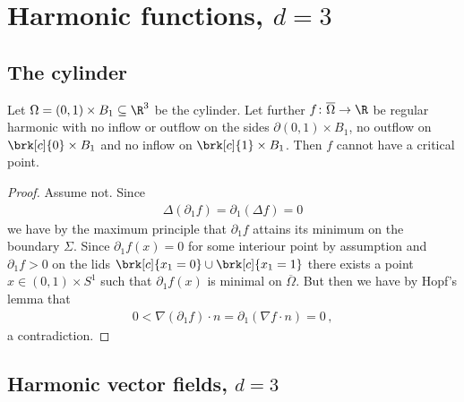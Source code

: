 
\newpage

\section{Harmonic functions, $d=3$}

\subsection{The cylinder}

\begin{proposition}
  Let $\Omega=(0,1)\times B_1\subseteq\R^3$ be the cylinder. Let further $f\colon\overline{\Omega}\to\R$ be regular 
  harmonic with no inflow or outflow on the sides 
  $\partial (0,1)\times B_1$, no outflow on $\brk[c]{0}\times B_1$ and no inflow on $\brk[c]{1}\times B_1$. 
  Then $f$ cannot have a critical point.
\end{proposition}
\begin{proof}
  Assume not. Since
  \begin{align*}
    \Delta(\partial_1f)=\partial_1(\Delta f)=0
  \end{align*}
  we have by the maximum principle that $\partial_1 f$ attains its minimum on the boundary $\Sigma$. Since $\partial_1 f(x)=0$ for some interiour point 
  by assumption and $\partial_1 f>0$ on the lids $\brk[c]{x_1=0}\cup\brk[c]{x_1=1}$ there exists a point
  $x\in(0,1)\times S^1$ such that $\partial_1f(x)$ is minimal on $\overline{\Omega}$. But then we have by Hopf's lemma
  that
  \begin{align*}
    0<\nabla (\partial_1f)\cdot n=\partial_1(\nabla f\cdot n)=0\,,
  \end{align*}
  a contradiction.
\end{proof}

\newpage

\subsection{Harmonic vector fields, $d=3$}

